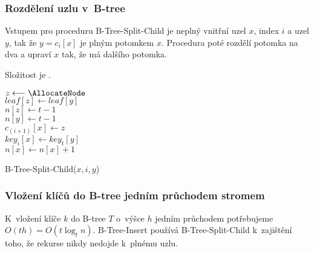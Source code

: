 \subsubsection{Rozdělení uzlu v~B-tree}

Vstupem pro proceduru B-Tree-Split-Child je neplný vnitřní uzel $x$,
index $i$ a uzel $y$, tak že $y=c_{i}[x]$ je plným potomkem $x$\@.
Procedura poté rozdělí potomka na dva a upraví $x$ tak, že má dalšího
potomka.

Složitost je .

%

\begin{algorithm}[t]
\SetAlgoLined
{}

{$z \longleftarrow \AllocateNode$}\\
{$leaf[z] \longleftarrow leaf[y]$}\\
{$n[z] \longleftarrow t-1$}\\
$n[y] \longleftarrow t-1$\\
$c_{(i+1)}[x] \longleftarrow z$\\
$key_i[x] \longleftarrow key_t[y]$\\
$n[x] \longleftarrow n[x]+1$
\caption[B-Tree-Split-Child($x, i, y$)]{B-Tree-Split-Child($x, i, y$)\cite{Cormen:2001:IA:580470}}
\end{algorithm}



\subsubsection{Vložení klíčů do B-tree jedním průchodem stromem}

K~vložení klíče $k$ do B-tree $T$ o~výšce $h$ jedním průchodem
potřebujeme $O(th)=O(t\log_{t}n)$\@. B-Tree-Insert používá B-Tree-Split-Child
k~zajištění toho, že rekurse nikdy nedojde k~plnému uzlu\@.

